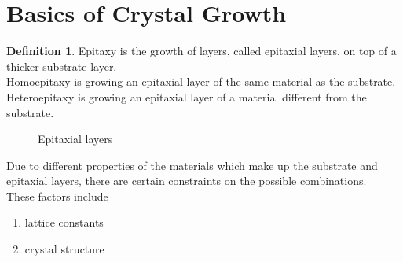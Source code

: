 \documentclass[titlepage, fleqn, a4paper, 12pt, twoside]{article}
\theoremstyle{definition}
\newtheorem{definition}{Definition}
\theoremstyle{theorem}
\let\Oldsection\section
\renewcommand{\section}{\FloatBarrier\Oldsection}
\begin{document}
\section{Basics of Crystal Growth}

\begin{definition}
	Epitaxy is the growth of layers, called epitaxial layers, on top of a thicker substrate layer.\\
	Homoepitaxy is growing an epitaxial layer of the same material as the substrate.
	Heteroepitaxy is growing an epitaxial layer of a material different from the substrate.
	\begin{figure}[H]
		\caption{Epitaxial layers}
	\end{figure}
\end{definition}

Due to different properties of the materials which make up the substrate and epitaxial layers, there are certain constraints on the possible combinations.\\
These factors include
\begin{enumerate}
	\item lattice constants
	\item crystal structure
\end{enumerate}
\end{document}
